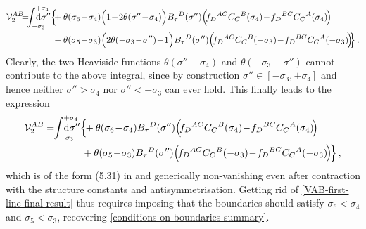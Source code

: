 \documentclass[12pt]{article}
\numberwithin{equation}{section}
\begin{document}
\begin{align}
\mathcal{V}_{2}^{AB}\!\!\!=\!\!\!\int_{-\sigma_{3}}^{+\sigma_{4}}\!\!\!\!\!\!\!\!\!\!\mathrm{d}\sigma'' \Bigl\{&\!\!\!+\theta(\sigma_{6}\!-\!\sigma_{4})\Bigl(1\!-\!2\theta(\sigma''\!-\!\sigma_{4}) \Bigr) B_{\tau}{}^{D}(\sigma'')\Bigl(\!f_{D}{}^{AC}C_{C}{}^{B}(\sigma_{4})\!-\!f_{D}{}^{BC}C_{C}{}^{A}(\sigma_{4})\!\Bigr)
\\
&\!\!\!-\theta(\sigma_{5}\!-\!\sigma_{3})\Bigl(2\theta(-\sigma_{3}\!-\!\sigma'')\!-\!1 \Bigr) B_{\tau}{}^{D}(\sigma'')\Bigl(\!f_{D}{}^{AC}C_{C}{}^{B}(-\sigma_{3})\!-\!f_{D}{}^{BC}C_{C}{}^{A}(-\sigma_{3})\!\Bigr) \!\! \Bigr\} \, .
\notag
\end{align}
Clearly, the two Heaviside functions $\theta(\sigma''-\sigma_{4})$ and $\theta(-\sigma_{3}-\sigma'')$ cannot contribute to the above integral, since by construction $\sigma''\in [-\sigma_{3},+\sigma_{4}]$ and hence neither $\sigma''>\sigma_{4}$ nor $\sigma''<-\sigma_{3}$ can ever hold. This finally leads to the expression
\begin{align}\label{VAB-first-line-final-result}
\mathcal{V}_{2}^{AB}=\!\!\int_{-\sigma_{3}}^{+\sigma_{4}}\!\!\!\!\!\!\!\!\!\!\mathrm{d}\sigma'' \Bigl\{&\!\!+\theta(\sigma_{6}\!-\!\sigma_{4}) B_{\tau}{}^{D}(\sigma'')\Bigl(\!f_{D}{}^{AC}C_{C}{}^{B}(\sigma_{4})\!-\!f_{D}{}^{BC}C_{C}{}^{A}(\sigma_{4})\!\Bigr)
\\
&\!\!\!+\theta(\sigma_{5}\!-\!\sigma_{3}) B_{\tau}{}^{D}(\sigma'')\Bigl(\!f_{D}{}^{AC}C_{C}{}^{B}(-\sigma_{3})\!-\!f_{D}{}^{BC}C_{C}{}^{A}(-\sigma_{3})\!\Bigr) \! \Bigr\} \, ,
\notag
\end{align}
which is of the form (5.31) in \cite{Klose:2016qfv} and generically non-vanishing even after contraction with the structure constants and antisymmetrisation. Getting rid of \eqref{VAB-first-line-final-result} thus requires imposing that the boundaries should satisfy $\sigma_{6}<\sigma_{4}$ and $\sigma_{5}<\sigma_{3}$, recovering \eqref{conditions-on-boundaries-summary}.
\end{document}
